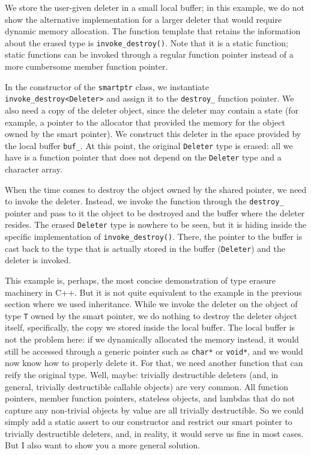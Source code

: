 We store the user-given deleter in a small local buffer; in this example, we do not show the alternative implementation for a larger deleter that would require dynamic memory allocation. The function template that retains the information about the erased type is \texttt{invoke\_destroy()}. Note that it is a static function; static functions can be invoked through a regular function pointer instead of a more cumbersome member function pointer.

In the constructor of the \texttt{smartptr} class, we instantiate \texttt{invoke\_destroy\textless{}Deleter\textgreater{}} and assign it to the \texttt{destroy\_} function pointer. We also need a copy of the deleter object, since the deleter may contain a state (for example, a pointer to the allocator that provided the memory for the object owned by the smart pointer). We construct this deleter in the space provided by the local buffer \texttt{buf\_}. At this point, the original \texttt{Deleter} type is erased: all we have is a function pointer that does not depend on the \texttt{Deleter} type and a character array.

When the time comes to destroy the object owned by the shared pointer, we need to invoke the deleter. Instead, we invoke the function through the \texttt{destroy\_} pointer and pass to it the object to be destroyed and the buffer where the deleter resides. The erased \texttt{Deleter} type is nowhere to be seen, but it is hiding inside the specific implementation of \texttt{invoke\_destroy()}. There, the pointer to the buffer is cast back to the type that is actually stored in the buffer (\texttt{Deleter}) and the deleter is invoked.

This example is, perhaps, the most concise demonstration of type erasure machinery in C++. But it is not quite equivalent to the example in the previous section where we used inheritance. While we invoke the deleter on the object of type \texttt{T} owned by the smart pointer, we do nothing to destroy the deleter object itself, specifically, the copy we stored inside the local buffer. The local buffer is not the problem here: if we dynamically allocated the memory instead, it would still be accessed through a generic pointer such as \texttt{char*} or \texttt{void*}, and we would now know how to properly delete it. For that, we need another function that can reify the original type. Well, maybe: trivially destructible deleters (and, in general, trivially destructible callable objects) are very common. All function pointers, member function pointers, stateless objects, and lambdas that do not capture any non-trivial objects by value are all trivially destructible. So we could simply add a static assert to our constructor and restrict our smart pointer to trivially destructible deleters, and, in reality, it would serve us fine in most cases. But I also want to show you a more general solution.

